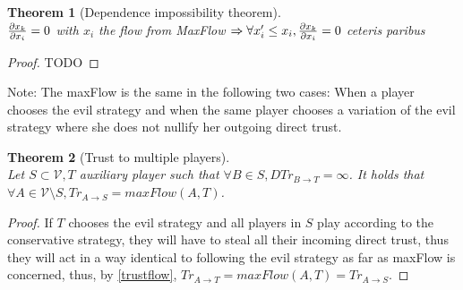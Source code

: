 \documentclass[11pt]{article}
\newtheorem{theorem}{Theorem}[section]
\theoremstyle{definition}
\theoremstyle{corollary}
\theoremstyle{lemma}
\begin{document}
    \begin{theorem}[Dependence impossibility theorem] \ \\
       \label{independence}
       ${\partial x_k \over \partial x_i} = 0$ with $x_i$ the flow from MaxFlow $\Rightarrow
         \forall x_i' \leq x_i, {\partial x_k \over \partial x_i} = 0$ ceteris paribus
    \end{theorem}
    \begin{proof}
       TODO
    \end{proof}
    Note: The maxFlow is the same in the following two cases: When a player chooses the evil strategy and when the same
    player chooses a variation of the evil strategy where she does not nullify her outgoing direct trust.

    \begin{theorem}[Trust to multiple players] \ \\
       \label{trustmany}
       Let $S \subset \mathcal{V}, T$ auxiliary player such that $\forall B \in S, DTr_{B \rightarrow T} = \infty$.
       It holds that $\forall A \in \mathcal{V} \setminus S, Tr_{A \rightarrow S} = maxFlow(A, T)$.
    \end{theorem}       
    \begin{proof}
       If $T$ chooses the evil strategy and all players in $S$ play according to the conservative strategy, they will have to steal
       all their incoming direct trust, thus they will act in a way identical to following the evil strategy as far as
       maxFlow is concerned, thus, by \ref{trustflow}, $Tr_{A \rightarrow T} = maxFlow(A, T) = Tr_{A \rightarrow S}$.
    \end{proof}
\end{document}
